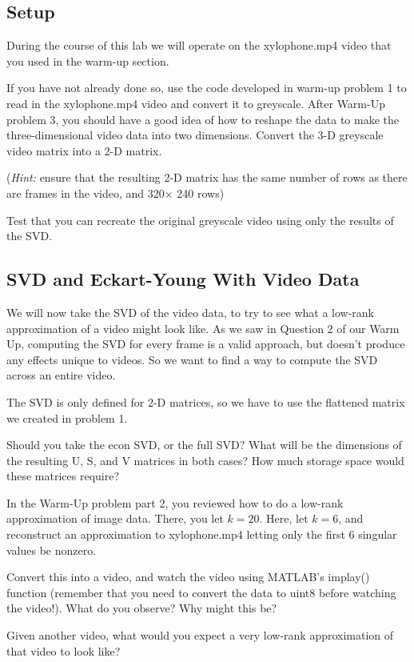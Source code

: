 \subsection{Setup}

During the course of this lab we will operate on the xylophone.mp4 video that you used in the warm-up section.

If you have not already done so, use the code developed in warm-up problem 1 to read in the xylophone.mp4 video and convert it to greyscale. After Warm-Up problem 3, you should have a good idea of how to reshape the data to make the three-dimensional video data into two dimensions. Convert the 3-D greyscale video matrix into a 2-D matrix.

(\textit{Hint:} ensure that the resulting 2-D matrix has the same number of rows as there are frames in the video, and 320$\times$ 240 rows)

Test that you can recreate the original greyscale video using only the results of the SVD.

\subsection{SVD and Eckart-Young With Video Data}

We will now take the SVD of the video data, to try to see what a low-rank approximation of a video might look like. As we saw in Question 2 of our Warm Up, computing the SVD for every frame is a valid approach, but doesn't produce any effects unique to videos. So we want to find a way to compute the SVD across an entire video.

The SVD is only defined for 2-D matrices, so we have to use the flattened matrix we created in problem 1.

Should you take the econ SVD, or the full SVD? What will be the dimensions of the resulting U, S, and V matrices in both cases? How much storage space would these matrices require?

In the Warm-Up problem part 2, you reviewed how to do a low-rank approximation of image data. There, you let $k=20$. Here, let $k=6$, and reconstruct an approximation to xylophone.mp4 letting only the first 6 singular values be nonzero.

Convert this into a video, and watch the video using MATLAB's implay() function (remember that you need to convert the data to uint8 before watching the video!). What do you observe? Why might this be?

Given another video, what would you expect a very low-rank approximation of that video to look like?

